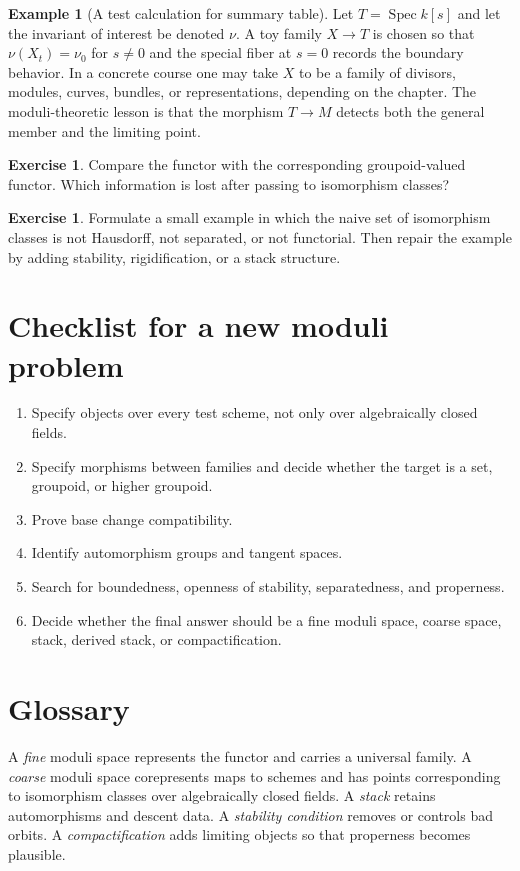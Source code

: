 \documentclass[11pt]{amsart}
\theoremstyle{definition}
\newtheorem{example}[theorem]{Example}
\newtheorem{exercise}[theorem]{Exercise}
\newcommand{\Spec}{\operatorname{Spec}}
\begin{document}
\begin{example}[A test calculation for summary table]
Let $T=\Spec k[s]$ and let the invariant of interest be denoted $\nu$.  A toy family $X\to T$ is chosen so that $\nu(X_t)=\nu_0$ for $s\ne0$ and the special fiber at $s=0$ records the boundary behavior.  In a concrete course one may take $X$ to be a family of divisors, modules, curves, bundles, or representations, depending on the chapter.  The moduli-theoretic lesson is that the morphism $T\to M$ detects both the general member and the limiting point.
\end{example}
\begin{exercise}
Compare the functor with the corresponding groupoid-valued functor.  Which information is lost after passing to isomorphism classes?
\end{exercise}
\begin{exercise}
Formulate a small example in which the naive set of isomorphism classes is not Hausdorff, not separated, or not functorial.  Then repair the example by adding stability, rigidification, or a stack structure.
\end{exercise}
\clearpage

\appendix
\section{Checklist for a new moduli problem}
\begin{enumerate}[label=\arabic*.]
\item Specify objects over every test scheme, not only over algebraically closed fields.
\item Specify morphisms between families and decide whether the target is a set, groupoid, or higher groupoid.
\item Prove base change compatibility.
\item Identify automorphism groups and tangent spaces.
\item Search for boundedness, openness of stability, separatedness, and properness.
\item Decide whether the final answer should be a fine moduli space, coarse space, stack, derived stack, or compactification.
\end{enumerate}
\section{Glossary}
A \emph{fine} moduli space represents the functor and carries a universal family.  A \emph{coarse} moduli space corepresents maps to schemes and has points corresponding to isomorphism classes over algebraically closed fields.  A \emph{stack} retains automorphisms and descent data.  A \emph{stability condition} removes or controls bad orbits.  A \emph{compactification} adds limiting objects so that properness becomes plausible.
\clearpage
\end{document}
